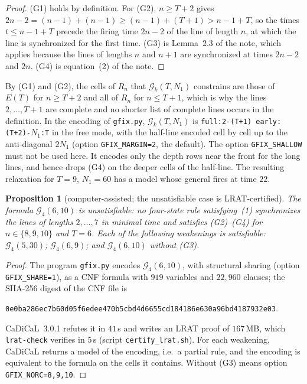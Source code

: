 \documentclass[11pt]{article}
\newtheorem{proposition}[theorem]{Proposition}
\theoremstyle{definition}
\theoremstyle{remark}
\begin{document}
\begin{proof}
(G1) holds by definition. For (G2), $n\ge T+2$ gives
$2n-2=(n-1)+(n-1)\ge(n-1)+(T+1)>n-1+T$, so the times $t\le n-1+T$ precede the
firing time $2n-2$ of the line of length $n$, at which the line is
synchronized for the first time. (G3) is Lemma~2.3 of the note, which applies
because the lines of lengths $n$ and $n+1$ are synchronized at times $2n-2$
and $2n$. (G4) is equation~(2) of the note.
\end{proof}

By (G1) and (G2), the cells of $R_n$ that $\mathcal G_k(T,N_1)$ constrains are
those of $E(T)$ for $n\ge T+2$ and all of $R_n$ for $n\le T+1$, which is why
the lines $2,\dots,T+1$ are complete and no shorter list of complete lines
occurs in the definition. In the encoding of \texttt{gfix.py}, $\mathcal
G_k(T,N_1)$ is \texttt{full:2-(T+1) early:(T+2)-$N_1$:T} in the free mode,
with the half-line encoded cell by cell up to the anti-diagonal $2N_1$
(option \texttt{GFIX\_MARGIN=2}, the default). The option
\texttt{GFIX\_SHALLOW} must not be used here. It encodes only the depth rows
near the front for the long lines, and hence drops (G4) on the deeper cells of
the half-line. The resulting relaxation for $T=9$, $N_1=60$ has a model whose
general fires at time $22$.

\begin{proposition}[computer-assisted; the unsatisfiable case is
LRAT-certified]\label{prop:G4}
The formula $\mathcal G_4(6,10)$ is unsatisfiable: no four-state rule
satisfying~(1) synchronizes the lines of lengths $2,\dots,7$ in minimal time
and satisfies (G2)--(G4) for $n\in\{8,9,10\}$ and $T=6$. Each of the
following weakenings is satisfiable: $\mathcal G_4(5,30)$; $\mathcal
G_4(6,9)$; and $\mathcal G_4(6,10)$ without (G3).
\end{proposition}

\begin{proof}
The program \texttt{gfix.py} encodes $\mathcal G_4(6,10)$, with structural
sharing (option \texttt{GFIX\_SHARE=1}), as a CNF formula with $919$ variables
and $22{,}960$ clauses; the SHA-256 digest of the CNF file is
\begin{center}\small
\texttt{0e0ba286ec7b60d05f6edee470b5cbd4d6655cd184186e630a96bd4187932e03}.
\end{center}
CaDiCaL~3.0.1 refutes it in $41$\,s and writes an LRAT proof of $167$\,MB,
which \texttt{lrat-check} verifies in $5$\,s (script
\texttt{certify\_lrat.sh}). For each weakening, CaDiCaL returns a model of the
encoding, i.e.\ a partial rule, and the encoding is equivalent to the formula
on the cells it contains. Without (G3) means option
\texttt{GFIX\_NORC=8,9,10}.
\end{proof}
\end{document}

